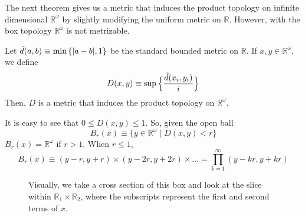   The next theorem gives us a metric that induces the product topology on infinite dimensional $\mathbb{R}^\omega$ by slightly modifying the uniform metric on $\mathbb{R}$. However, with the box topology $\mathbb{R}^\omega$ is not metrizable. 

  \begin{theorem}
    Let $\Tilde{d} (a, b) \equiv \min{\{|a-b|, 1\}}$ be the standard bounded metric on $\mathbb{R}$. If $x, y \in \mathbb{R}^\omega$, we define
    \begin{equation}
      D(x, y) \equiv \sup{\Big\{ \frac{\Tilde{d}(x_i, y_i)}{i}\Big\}}
    \end{equation}
    Then, $D$ is a metric that induces the product topology on $\mathbb{R}^\omega$. 
  \end{theorem}
  
  It is easy to see that $0 \leq D(x, y) \leq 1$. So, given the open ball
  \begin{equation}
    B_r (x) \equiv \{y \in \mathbb{R}^\omega \; | \; D(x, y) < r\}
  \end{equation}
  $B_r (x) = \mathbb{R}^\omega$ if $r > 1$. When $r \leq 1$, 
  \begin{equation}
    B_r (x) \equiv (y-r, y+r) \times (y-2r, y+2r) \times ... = \prod_{k=1}^\infty (y - k r , y + k r)
  \end{equation}

  \begin{figure}[H]
    \centering 
    \caption{Visually, we take a cross section of this box and look at the slice within $\mathbb{R}_1 \times \mathbb{R}_2$, where the subscripts represent the first and second terms of $x$.}
    \label{fig:cross_sec}
  \end{figure}

